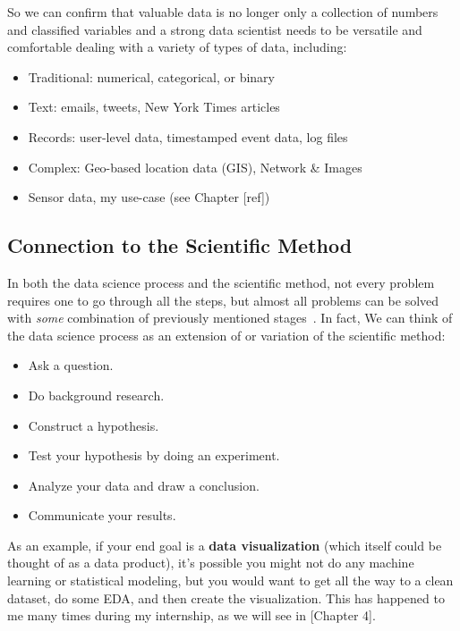 So we can confirm that valuable data is no longer only a collection of numbers and classified variables and 
a strong data scientist needs to be versatile and comfortable dealing with a variety of types of data, including:
\begin{itemize}
    \item Traditional: numerical, categorical, or binary 
    \item Text: emails, tweets, New York Times articles
    \item Records: user-level data, timestamped event data, log files
    \item Complex: Geo-based location data (GIS), Network \& Images
    \item Sensor data, my use-case (see Chapter [ref])
\end{itemize}

\subsection{Connection to the Scientific Method}
In both the data science process and the scientific method, not every problem requires one to go through all the steps, but almost all problems can be solved with \textit{some} combination of previously mentioned stages~\cite{Book:doing_data_science}.
In fact, We can think of the data science process as an extension of or variation of the scientific method:
\begin{itemize}
    \item Ask a question.
    \item Do background research.
    \item Construct a hypothesis.
    \item Test your hypothesis by doing an experiment.
    \item Analyze your data and draw a conclusion.
    \item Communicate your results.
\end{itemize}
As an example, if your end goal is a \textbf{data visualization} (which itself could be thought of as a data product), it’s possible you might not do any machine learning or statistical modeling,
but you would want to get all the way to a clean dataset, do some \acl{EDA}, and then create the visualization. This has happened to me many times during my internship, as we will see in [Chapter 4].

